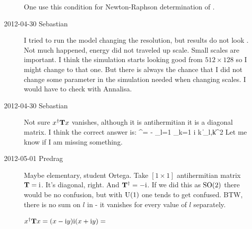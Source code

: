 \begin{description}

One use this condition for Newton-Raphson determination of \sspRed.

\item[2012-04-30 Sebastian]
I tried to run the model changing the resolution, but results
do not look . Not much happened, energy did not traveled up scale.
Small scales are important. I think the simulation starts looking good
from $512 \times 128$ so I might change to that one. But there is always the
chance that I did not change some parameter in the simulation needed when
changing scales. I would have to check with Annalisa.

\item[2012-04-30 Sebastian]
Not sure $x^\dagger \mathbf{T} x$ vanishes, although it is antihermitian
it is a diagonal matrix. I think the correct answer is:
\beq
\ssp^\dagger \Lg \ssp = - \sum_{l=1} \sum_{k=1} i k \| \ssp_{l,k}\|^2
Let me know if I am missing something.

\item[2012-05-01 Predrag]
Maybe elementary, student Ortega. Take $[1\!\times\!1]$ antihermitian matrix $\mathbf{T} = \mathrm{i}$.
It's diagonal, right. And  $\mathbf{T}^\dagger = - \mathrm{i}$. If we did this as $\textrm{SO}(2)$ there would be
no confusion, but with $\textrm{U}(1)$ one tends to get confused. BTW, there is no sum on $l$ in
 - it vanishes for every value of $l$ separately.

$x^\dagger \mathbf{T} x= (x-\mathrm{i} y)\mathrm{i} (x+\mathrm{i} y) = $


\end{description}
